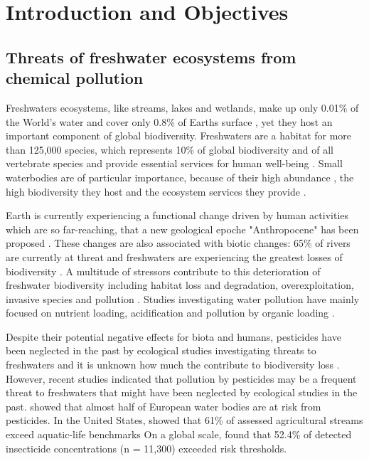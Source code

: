 
\chapter{Introduction and Objectives}
\label{sec:introduction} 

\section{Threats of freshwater ecosystems from chemical pollution}

Freshwaters ecosystems, like streams, lakes and wetlands, make up only 0.01\% of the World's water and cover only 0.8\% of Earths surface \citep{dudgeon_freshwater_2006}, yet they host an important component of global biodiversity. 
Freshwaters are a habitat for more than 125,000 species, which represents 10\% of global biodiversity and  of all vertebrate species \citep{balian_freshwater_2007,  strayer_freshwater_2010} and provide essential services for human well-being \citep{aylward_freshwater_2005}. 
Small waterbodies are of particular importance, because of their high abundance \citep{downing_global_2012}, the high biodiversity they host \citep{davies_comparative_2008} and the ecosystem services they provide \citep{biggs_importance_2016}. 

Earth is currently experiencing a functional change driven by human activities which are so far-reaching, that a new geological epoche "Anthropocene" has been proposed \citep{waters_anthropocene_2016}. 
These changes are also associated with biotic changes: 65\% of rivers are currently at threat \citep{vorosmarty_global_2010} and freshwaters are experiencing the greatest losses of biodiversity \citep{wwf_living_2016}. 
A multitude of stressors contribute to this deterioration of freshwater biodiversity including habitat loss and degradation, overexploitation, invasive species and pollution \citep{dudgeon_freshwater_2006, vorosmarty_global_2010, wwf_living_2016}. 
Studies investigating water pollution have mainly focused on nutrient loading, acidification and pollution by organic loading \citep{schafer_contribution_2016}. 

Despite their potential negative effects for biota and humans, pesticides have been neglected in the past by ecological studies investigating threats to freshwaters \citep{schafer_contribution_2016} and it is unknown how much the contribute to biodiversity loss \citep{rockstrom_safe_2009.persson_confronting_2013}. 
However, recent studies indicated that pollution by pesticides may be a frequent threat to freshwaters that might have been neglected by ecological studies in the past.
\citet{malaj_organic_2014} showed that almost half of European water bodies are at risk from pesticides. 
In the United States, \citet{stone_pesticides_2014} showed that 61\% of assessed agricultural streams exceed aquatic-life benchmarks
On a global scale, \citet{stehle_pesticide_2015} found that 52.4\% of detected insecticide concentrations (n = 11,300) exceeded risk thresholds.

